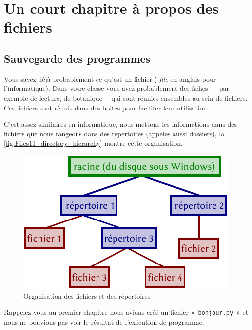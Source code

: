 



\chapter{Un court chapitre à propos des fichiers}\label{ch:ashortchapteraboutfiles}
\section{Sauvegarde des programmes}

Vous savez déjà probablement ce qu'est un fichier ( \emph{file} en anglais pour l'informatique).
Dans votre classe vous avez probablement des fiches --- par exemple de lecture, de botanique--- qui sont réunies ensembles au sein de fichiers. Ces fichiers sont réunis dans des boites pour faciliter leur utilisation.

C'est assez similaires en informatique, nous mettons les informations dans des fichiers que nous rangeons dans des répertoires (appelés aussi dossiers), la \autoref{fig:Files11_directory_hierarchy} montre cette organisation.

\begin{figure}[h!]
\centering
\includegraphics[scale=1]{images/Files11_directory_hierarchy.pdf}
\caption{Organisation des fichiers et des répertoires}\label{fig:Files11_directory_hierarchy}
\end{figure}


Rappelez-vous au premier chapitre nous avions créé un fichier «~\texttt{bonjour.py}~» et nous ne pouvions pas voir le résultat de l'exécution de programme.

